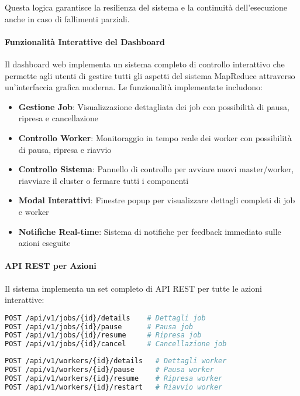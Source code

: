 \documentclass[12pt,a4paper]{article}
\begin{document}
Questa logica garantisce la resilienza del sistema e la continuità dell'esecuzione anche in caso di fallimenti parziali.

\paragraph{Funzionalità Interattive del Dashboard}
Il dashboard web implementa un sistema completo di controllo interattivo che permette agli utenti di gestire tutti gli aspetti del sistema MapReduce attraverso un'interfaccia grafica moderna. Le funzionalità implementate includono:

\begin{itemize}
\item \textbf{Gestione Job}: Visualizzazione dettagliata dei job con possibilità di pausa, ripresa e cancellazione
\item \textbf{Controllo Worker}: Monitoraggio in tempo reale dei worker con possibilità di pausa, ripresa e riavvio
\item \textbf{Controllo Sistema}: Pannello di controllo per avviare nuovi master/worker, riavviare il cluster o fermare tutti i componenti
\item \textbf{Modal Interattivi}: Finestre popup per visualizzare dettagli completi di job e worker
\item \textbf{Notifiche Real-time}: Sistema di notifiche per feedback immediato sulle azioni eseguite
\end{itemize}

\paragraph{API REST per Azioni}
Il sistema implementa un set completo di API REST per tutte le azioni interattive:

\begin{lstlisting}[language=bash, caption=API Endpoints per Azioni Job]
POST /api/v1/jobs/{id}/details    # Dettagli job
POST /api/v1/jobs/{id}/pause      # Pausa job
POST /api/v1/jobs/{id}/resume     # Ripresa job
POST /api/v1/jobs/{id}/cancel     # Cancellazione job
\end{lstlisting}

\begin{lstlisting}[language=bash, caption=API Endpoints per Azioni Worker]
POST /api/v1/workers/{id}/details   # Dettagli worker
POST /api/v1/workers/{id}/pause     # Pausa worker
POST /api/v1/workers/{id}/resume    # Ripresa worker
POST /api/v1/workers/{id}/restart   # Riavvio worker
\end{lstlisting}
\end{document}
